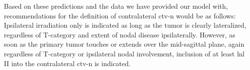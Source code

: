 \documentclass[\relativeRoot/main.tex]{subfiles}
\begin{document}
Based on these predictions and the data we have provided our model with, recommendations for the definition of contralateral \gls{ctv-n} would be as follows: Ipsilateral irradiation only is indicated as long as the tumor is clearly lateralized, regardless of T-category and extent of nodal disease ipsilaterally. However, as soon as the primary tumor touches or extends over the mid-sagittal plane, again regardless of T-category or ipsilateral nodal involvement, inclusion of at least \gls{lnl} II into the contralateral \gls{ctv-n} is indicated.
\end{document}

